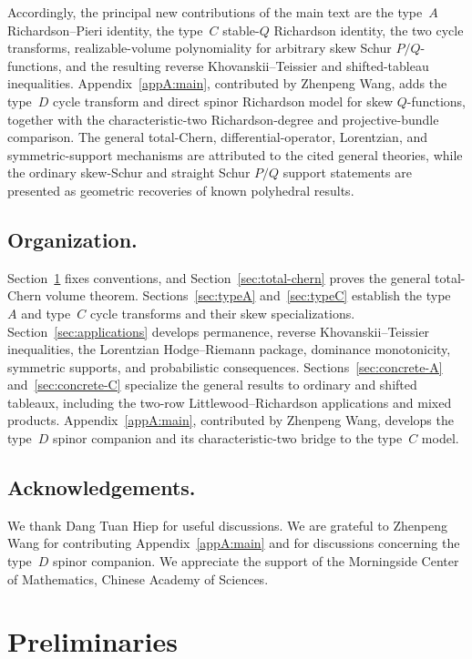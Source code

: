 \documentclass[11pt,a4paper,oneside]{amsart}
\numberwithin{equation}{section}
\theoremstyle{definition}
\theoremstyle{remark}
\begin{document}
Accordingly, the principal new contributions of the main text are the type~$A$ Richardson--Pieri identity, the type~$C$ stable-$Q$ Richardson identity, the two cycle transforms, realizable-volume polynomiality for arbitrary skew Schur $P/Q$-functions, and the resulting reverse Khovanskii--Teissier and shifted-tableau inequalities.  Appendix~\ref{appA:main}, contributed by Zhenpeng Wang, adds the type~$D$ cycle transform and direct spinor Richardson model for skew $Q$-functions, together with the characteristic-two Richardson-degree and projective-bundle comparison.  The general total-Chern, differential-operator, Lorentzian, and symmetric-support mechanisms are attributed to the cited general theories, while the ordinary skew-Schur and straight Schur $P/Q$ support statements are presented as geometric recoveries of known polyhedral results.



\subsection*{Organization.}
Section~\ref{sec:preliminaries} fixes conventions, and Section~\ref{sec:total-chern} proves the general total-Chern volume theorem.  Sections~\ref{sec:typeA} and~\ref{sec:typeC} establish the type~$A$ and type~$C$ cycle transforms and their skew specializations.  Section~\ref{sec:applications} develops permanence, reverse Khovanskii--Teissier inequalities, the Lorentzian Hodge--Riemann package, dominance monotonicity, symmetric supports, and probabilistic consequences.  Sections~\ref{sec:concrete-A} and~\ref{sec:concrete-C} specialize the general results to ordinary and shifted tableaux, including the two-row Littlewood--Richardson applications and mixed products.  Appendix~\ref{appA:main}, contributed by Zhenpeng Wang, develops the type~$D$ spinor companion and its characteristic-two bridge to the type~$C$ model.


\subsection*{Acknowledgements.}
We thank Dang Tuan Hiep for useful discussions.  We are grateful to Zhenpeng Wang for contributing Appendix~\ref{appA:main} and for discussions concerning the type~$D$ spinor companion.  We appreciate the support of the Morningside Center of Mathematics, Chinese Academy of Sciences.

\section{Preliminaries}\label{sec:preliminaries}
\end{document}
